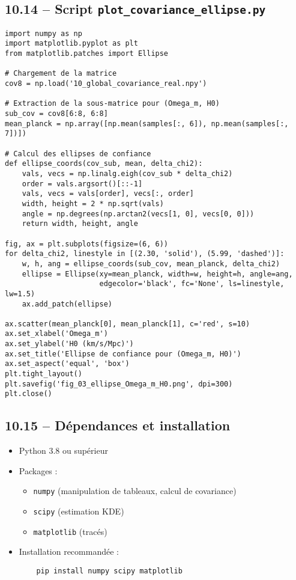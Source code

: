 \subsection{10.14 – Script \texttt{plot\_covariance\_ellipse.py}}
\begin{verbatim}
import numpy as np
import matplotlib.pyplot as plt
from matplotlib.patches import Ellipse

# Chargement de la matrice
cov8 = np.load('10_global_covariance_real.npy')

# Extraction de la sous-matrice pour (Omega_m, H0)
sub_cov = cov8[6:8, 6:8]
mean_planck = np.array([np.mean(samples[:, 6]), np.mean(samples[:, 7])])

# Calcul des ellipses de confiance
def ellipse_coords(cov_sub, mean, delta_chi2):
    vals, vecs = np.linalg.eigh(cov_sub * delta_chi2)
    order = vals.argsort()[::-1]
    vals, vecs = vals[order], vecs[:, order]
    width, height = 2 * np.sqrt(vals)
    angle = np.degrees(np.arctan2(vecs[1, 0], vecs[0, 0]))
    return width, height, angle

fig, ax = plt.subplots(figsize=(6, 6))
for delta_chi2, linestyle in [(2.30, 'solid'), (5.99, 'dashed')]:
    w, h, ang = ellipse_coords(sub_cov, mean_planck, delta_chi2)
    ellipse = Ellipse(xy=mean_planck, width=w, height=h, angle=ang,
                      edgecolor='black', fc='None', ls=linestyle, lw=1.5)
    ax.add_patch(ellipse)

ax.scatter(mean_planck[0], mean_planck[1], c='red', s=10)
ax.set_xlabel('Omega_m')
ax.set_ylabel('H0 (km/s/Mpc)')
ax.set_title('Ellipse de confiance pour (Omega_m, H0)')
ax.set_aspect('equal', 'box')
plt.tight_layout()
plt.savefig('fig_03_ellipse_Omega_m_H0.png', dpi=300)
plt.close()
\end{verbatim}

\subsection{10.15 – Dépendances et installation}
\begin{itemize}
  \item Python 3.8 ou supérieur
  \item Packages :
    \begin{itemize}
      \item \texttt{numpy} (manipulation de tableaux, calcul de covariance)
      \item \texttt{scipy} (estimation KDE)
      \item \texttt{matplotlib} (tracés)
    \end{itemize}
  \item Installation recommandée :
    \begin{verbatim}
    pip install numpy scipy matplotlib
    \end{verbatim}
\end{itemize}

